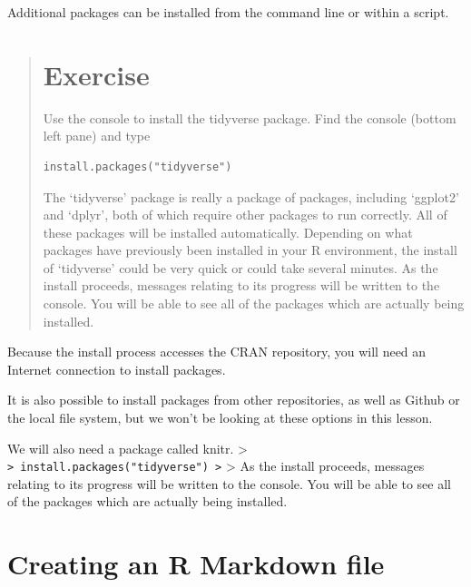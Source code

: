 \documentclass[]{book}
\begin{document}
Additional packages can be installed from the command line or within a
script.

\begin{quote}
\section{Exercise}\label{exercise}

Use the console to install the tidyverse package. Find the console
(bottom left pane) and type

\begin{verbatim}
install.packages("tidyverse")
\end{verbatim}

The `tidyverse' package is really a package of packages, including
`ggplot2' and `dplyr', both of which require other packages to run
correctly. All of these packages will be installed automatically.
Depending on what packages have previously been installed in your R
environment, the install of `tidyverse' could be very quick or could
take several minutes. As the install proceeds, messages relating to its
progress will be written to the console. You will be able to see all of
the packages which are actually being installed.
\end{quote}

Because the install process accesses the CRAN repository, you will need
an Internet connection to install packages.

It is also possible to install packages from other repositories, as well
as Github or the local file system, but we won't be looking at these
options in this lesson.

We will also need a package called knitr. \textgreater{}
\texttt{\textgreater{}\ install.packages("tidyverse")\ \textgreater{}}
\textgreater{} As the install proceeds, messages relating to its
progress will be written to the console. You will be able to see all of
the packages which are actually being installed.

\section{Creating an R Markdown file}\label{creating-an-r-markdown-file}
\end{document}
